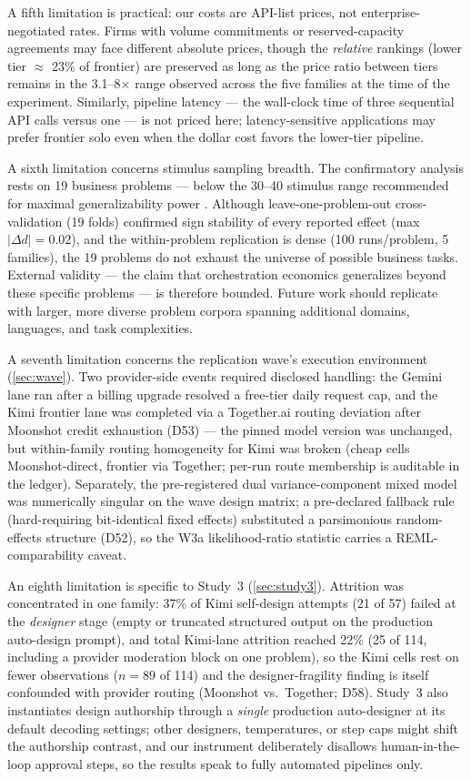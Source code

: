 \documentclass[12pt,a4paper]{article}
\begin{document}
A fifth limitation is practical: our costs are API-list prices, not
enterprise-negotiated rates. Firms with volume commitments or reserved-capacity
agreements may face different absolute prices, though the \emph{relative}
rankings (lower tier $\approx$ 23\% of frontier) are preserved as long as the
price ratio between tiers remains in the 3.1--8$\times$ range observed across the
five families at the time of the experiment. Similarly, pipeline latency --- the
wall-clock time of three sequential API calls versus one --- is not priced here;
latency-sensitive applications may prefer frontier solo even when the dollar
cost favors the lower-tier pipeline.

A sixth limitation concerns stimulus sampling breadth. The confirmatory
analysis rests on 19 business problems --- below the 30--40 stimulus range
recommended for maximal generalizability power \citep{WestfallKennyJudd2014}.
Although leave-one-problem-out cross-validation (19 folds)
confirmed sign stability of every reported effect (max $|\Delta d| = 0.02$),
and the within-problem replication is dense (100 runs/problem, 5
families), the 19 problems do not exhaust the universe of possible
business tasks. External validity --- the claim that orchestration
economics generalizes beyond these specific problems --- is therefore
bounded. Future work should replicate with larger, more diverse problem
corpora spanning additional domains, languages, and task complexities.

A seventh limitation concerns the replication wave's execution environment
(\cref{sec:wave}). Two provider-side events required disclosed handling: the
Gemini lane ran after a billing upgrade resolved a free-tier daily request
cap, and the Kimi frontier lane was completed via a Together.ai routing
deviation after Moonshot credit exhaustion (D53) --- the pinned model version
was unchanged, but within-family routing homogeneity for Kimi was broken
(cheap cells Moonshot-direct, frontier via Together; per-run route membership
is auditable in the ledger). Separately, the pre-registered dual
variance-component mixed model was numerically singular on the wave design
matrix; a pre-declared fallback rule (hard-requiring bit-identical fixed
effects) substituted a parsimonious random-effects structure (D52), so the
W3a likelihood-ratio statistic carries a REML-comparability caveat.

An eighth limitation is specific to Study~3 (\cref{sec:study3}). Attrition was concentrated in one family: 37\% of Kimi self-design
attempts (21 of 57) failed at the \emph{designer} stage (empty or
truncated structured output on the production auto-design prompt), and
total Kimi-lane attrition reached 22\% (25 of 114, including a provider
moderation block on one problem), so the Kimi cells rest on fewer
observations ($n = 89$ of 114) and the designer-fragility finding is
itself confounded with provider routing (Moonshot vs.\ Together; D58). Study~3
also instantiates design authorship through a \emph{single} production
auto-designer at its default decoding settings; other designers, temperatures,
or step caps might shift the authorship contrast, and our instrument
deliberately disallows human-in-the-loop approval steps, so the results speak
to fully automated pipelines only.
\end{document}
